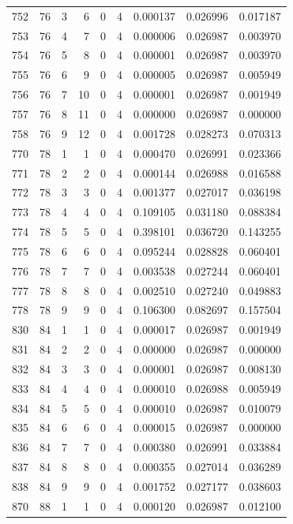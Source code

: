 \begin{longtable}{rrrrrrrrr}
752 & 76 & 3 & 6 & 0 & 4 & 0.000137 & 0.026996 & 0.017187 \\
753 & 76 & 4 & 7 & 0 & 4 & 0.000006 & 0.026987 & 0.003970 \\
754 & 76 & 5 & 8 & 0 & 4 & 0.000001 & 0.026987 & 0.003970 \\
755 & 76 & 6 & 9 & 0 & 4 & 0.000005 & 0.026987 & 0.005949 \\
756 & 76 & 7 & 10 & 0 & 4 & 0.000001 & 0.026987 & 0.001949 \\
757 & 76 & 8 & 11 & 0 & 4 & 0.000000 & 0.026987 & 0.000000 \\
758 & 76 & 9 & 12 & 0 & 4 & 0.001728 & 0.028273 & 0.070313 \\
770 & 78 & 1 & 1 & 0 & 4 & 0.000470 & 0.026991 & 0.023366 \\
771 & 78 & 2 & 2 & 0 & 4 & 0.000144 & 0.026988 & 0.016588 \\
772 & 78 & 3 & 3 & 0 & 4 & 0.001377 & 0.027017 & 0.036198 \\
773 & 78 & 4 & 4 & 0 & 4 & 0.109105 & 0.031180 & 0.088384 \\
774 & 78 & 5 & 5 & 0 & 4 & 0.398101 & 0.036720 & 0.143255 \\
775 & 78 & 6 & 6 & 0 & 4 & 0.095244 & 0.028828 & 0.060401 \\
776 & 78 & 7 & 7 & 0 & 4 & 0.003538 & 0.027244 & 0.060401 \\
777 & 78 & 8 & 8 & 0 & 4 & 0.002510 & 0.027240 & 0.049883 \\
778 & 78 & 9 & 9 & 0 & 4 & 0.106300 & 0.082697 & 0.157504 \\
830 & 84 & 1 & 1 & 0 & 4 & 0.000017 & 0.026987 & 0.001949 \\
831 & 84 & 2 & 2 & 0 & 4 & 0.000000 & 0.026987 & 0.000000 \\
832 & 84 & 3 & 3 & 0 & 4 & 0.000001 & 0.026987 & 0.008130 \\
833 & 84 & 4 & 4 & 0 & 4 & 0.000010 & 0.026988 & 0.005949 \\
834 & 84 & 5 & 5 & 0 & 4 & 0.000010 & 0.026987 & 0.010079 \\
835 & 84 & 6 & 6 & 0 & 4 & 0.000015 & 0.026987 & 0.000000 \\
836 & 84 & 7 & 7 & 0 & 4 & 0.000380 & 0.026991 & 0.033884 \\
837 & 84 & 8 & 8 & 0 & 4 & 0.000355 & 0.027014 & 0.036289 \\
838 & 84 & 9 & 9 & 0 & 4 & 0.001752 & 0.027177 & 0.038603 \\
870 & 88 & 1 & 1 & 0 & 4 & 0.000120 & 0.026987 & 0.012100 \\

\end{longtable}
